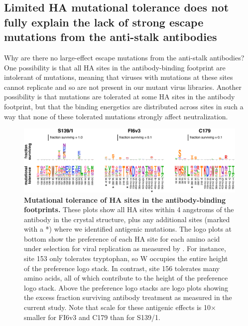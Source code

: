 \documentclass[11pt]{article}
\begin{document}
\subsection*{Limited HA mutational tolerance does not fully explain the lack of strong escape mutations from the anti-stalk antibodies}
Why are there no large-effect escape mutations from the anti-stalk antibodies?
One possibility is that all HA sites in the antibody-binding footprint are intolerant of mutations, meaning that viruses with mutations at these sites cannot replicate and so are not present in our mutant virus libraries.
Another possibility is that mutations are tolerated at some HA sites in the antibody footprint, but that the binding energetics are distributed across sites in such a way that none of these tolerated mutations strongly affect neutralization.

\begin{figure}
\centerline{\includegraphics[width=\textwidth]{figs/prefs_fracsurvive/prefs_fracsurvive_logoplots.pdf}}
\caption{
\label{fig:muttolerance}
{\bf Mutational tolerance of HA sites in the antibody-binding footprints.}
These plots show all HA sites within 4 angstroms of the antibody in the crystal structure, plus any additional sites (marked with a *) where we identified antigenic mutations. 
The logo plots at bottom show the preference of each HA site for each amino acid under selection for viral replication as measured by \citet{doud2016accurate}.
For instance, site 153 only tolerates tryptophan, so W occupies the entire height of the preference logo stack.
In contrast, site 156 tolerates many amino acids, all of which contribute to the height of the preference logo stack. 
Above the preference logo stacks are logo plots showing the excess fraction surviving antibody treatment as measured in the current study.
Note that scale for these antigenic effects is 10$\times$ smaller for FI6v3 and C179 than for S139/1.
}
\end{figure}
\end{document}
